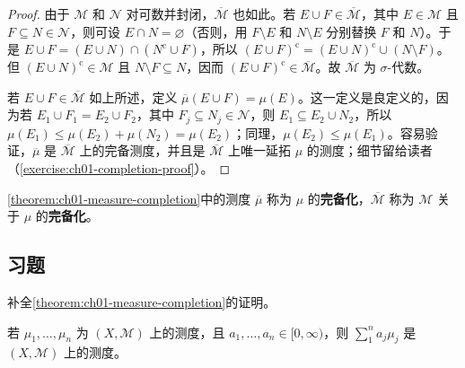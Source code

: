 \documentclass[../../main.tex]{subfiles}%
\begin{document}
\begin{proof}
由于 $\mathscr{M}$ 和 $\mathscr{N}$ 对可数并封闭，$\overline{\mathscr{M}}$ 也如此。若 $E\cup F\in\overline{\mathscr{M}}$，其中 $E\in\mathscr{M}$ 且 $F\subseteq N\in\mathscr{N}$，则可设 $E\cap N=\varnothing$（否则，用 $F\setminus E$ 和 $N\setminus E$ 分别替换 $F$ 和 $N$）。于是 $E\cup F=(E\cup N)\cap(N^{\mathrm{c}}\cup F)$，所以 $(E\cup F)^{\mathrm{c}}=(E\cup N)^{\mathrm{c}}\cup(N\setminus F)$。但 $(E\cup N)^{\mathrm{c}}\in\mathscr{M}$ 且 $N\setminus F\subseteq N$，因而 $(E\cup F)^{\mathrm{c}}\in\overline{\mathscr{M}}$。故 $\overline{\mathscr{M}}$ 为 $\sigma$-代数。

若 $E\cup F\in\overline{\mathscr{M}}$ 如上所述，定义 $\overline{\mu}(E\cup F)=\mu(E)$。这一定义是良定义的，因为若 $E_1\cup F_1=E_2\cup F_2$，其中 $F_j\subseteq N_j\in\mathscr{N}$，则 $E_1\subseteq E_2\cup N_2$，所以 $\mu(E_1)\leqslant\mu(E_2)+\mu(N_2)=\mu(E_2)$；同理，$\mu(E_2)\leqslant\mu(E_1)$。容易验证，$\overline{\mu}$ 是 $\overline{\mathscr{M}}$ 上的完备测度，并且是 $\overline{\mathscr{M}}$ 上唯一延拓 $\mu$ 的测度；细节留给读者（\cref{exercise:ch01-completion-proof}）。
\end{proof}


\begin{definition}\label{definition:ch01-completion-terminology}
\cref{theorem:ch01-measure-completion}中的测度 $\overline{\mu}$ 称为 $\mu$ 的\textbf{完备化}，$\overline{\mathscr{M}}$ 称为 $\mathscr{M}$ 关于 $\mu$ 的\textbf{完备化}。
\end{definition}


\subsection*{习题}

\begin{exercise}\label{exercise:ch01-completion-proof}
补全\cref{theorem:ch01-measure-completion}的证明。
\end{exercise}

\begin{exercise}\label{exercise:ch01-linear-combination}
若 $\mu_1,\ldots,\mu_n$ 为 $(X,\mathscr{M})$ 上的测度，且 $a_1,\ldots,a_n\in[0,\infty)$，则 $\sum_1^na_j\mu_j$ 是 $(X,\mathscr{M})$ 上的测度。
\end{exercise}
\end{document}

